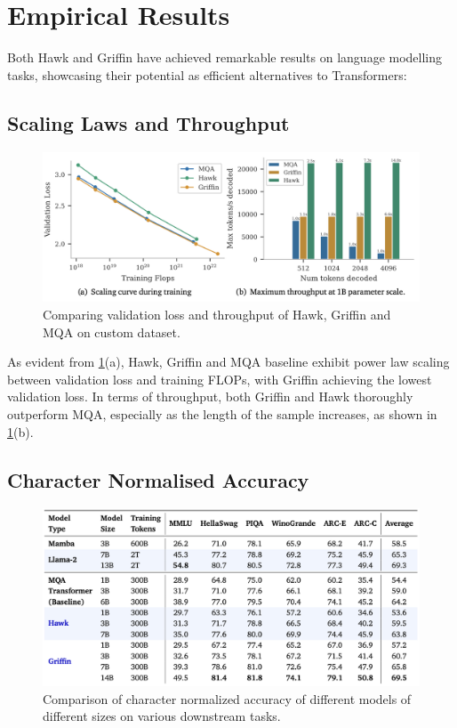 \documentclass[12pt,a4paper]{report}
\begin{document}
\section{Empirical Results}
Both Hawk and Griffin have achieved remarkable results on language modelling tasks, showcasing their potential as efficient alternatives to Transformers:

\subsection{Scaling Laws and Throughput}

\begin{figure}[ht]
    \centerline{\includegraphics[scale=0.6]{C5.3.7_Griffin_Scaling.png}}
    \caption{Comparing validation loss and throughput of Hawk, Griffin and MQA on custom dataset.}
    \label{hg_scaling}
\end{figure}

As evident from \ref{hg_scaling}(a), Hawk, Griffin and MQA baseline exhibit power law scaling between validation loss and training FLOPs, with Griffin achieving the lowest validation loss. In terms of throughput, both Griffin and Hawk thoroughly outperform MQA, especially as the length of the sample increases, as shown in \ref{hg_scaling}(b).


\subsection{Character Normalised Accuracy}

\begin{figure}[ht]
    \centerline{\includegraphics[scale=0.65]{C5.3.7_Griffin_Perf.png}}
    \caption{Comparison of character normalized accuracy of different models of different sizes on various downstream tasks.}
    \label{griffin-perf}
\end{figure}
\end{document}
